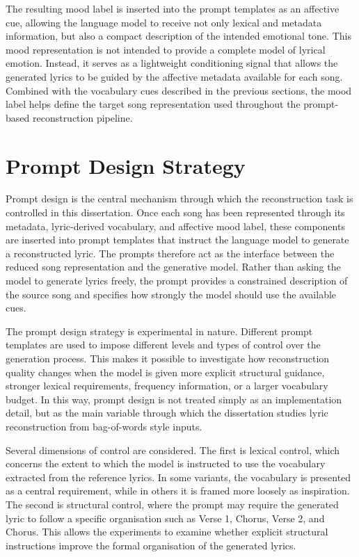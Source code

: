 The resulting mood label is inserted into the prompt templates as an affective cue, allowing the language model to receive not only lexical and metadata information, but also a compact description of the intended emotional tone. This mood representation is not intended to provide a complete model of lyrical emotion. Instead, it serves as a lightweight conditioning signal that allows the generated lyrics to be guided by the affective metadata available for each song. Combined with the vocabulary cues described in the previous sections, the mood label helps define the target song representation used throughout the prompt-based reconstruction pipeline.

\section{Prompt Design Strategy}

Prompt design is the central mechanism through which the reconstruction task is controlled in this dissertation. Once each song has been represented through its metadata, lyric-derived vocabulary, and affective mood label, these components are inserted into prompt templates that instruct the language model to generate a reconstructed lyric. The prompts therefore act as the interface between the reduced song representation and the generative model. Rather than asking the model to generate lyrics freely, the prompt provides a constrained description of the source song and specifies how strongly the model should use the available cues.

The prompt design strategy is experimental in nature. Different prompt templates are used to impose different levels and types of control over the generation process. This makes it possible to investigate how reconstruction quality changes when the model is given more explicit structural guidance, stronger lexical requirements, frequency information, or a larger vocabulary budget. In this way, prompt design is not treated simply as an implementation detail, but as the main variable through which the dissertation studies lyric reconstruction from bag-of-words style inputs.

Several dimensions of control are considered. The first is lexical control, which concerns the extent to which the model is instructed to use the vocabulary extracted from the reference lyrics. In some variants, the vocabulary is presented as a central requirement, while in others it is framed more loosely as inspiration. The second is structural control, where the prompt may require the generated lyric to follow a specific organisation such as Verse 1, Chorus, Verse 2, and Chorus. This allows the experiments to examine whether explicit structural instructions improve the formal organisation of the generated lyrics.

